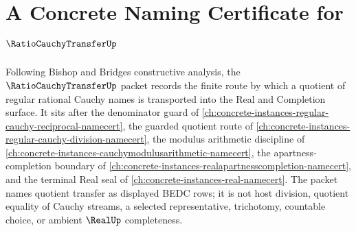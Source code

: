 \chapter{A Concrete Naming Certificate for $\RatioCauchyTransferUp$}
\label{ch:concrete-instances-ratio-cauchy-transfer-namecert}

Following Bishop and Bridges constructive analysis, the $\RatioCauchyTransferUp$ packet records the finite route by which a quotient of regular rational Cauchy names is transported into the Real and Completion surface. It sits after the denominator guard of \autoref{ch:concrete-instances-regular-cauchy-reciprocal-namecert}, the guarded quotient route of \autoref{ch:concrete-instances-regular-cauchy-division-namecert}, the modulus arithmetic discipline of \autoref{ch:concrete-instances-cauchymodulusarithmetic-namecert}, the apartness-completion boundary of \autoref{ch:concrete-instances-realapartnesscompletion-namecert}, and the terminal Real seal of \autoref{ch:concrete-instances-real-namecert}. The packet names quotient transfer as displayed BEDC rows; it is not host division, quotient equality of Cauchy streams, a selected representative, trichotomy, countable choice, or ambient $\RealUp$ completeness.

